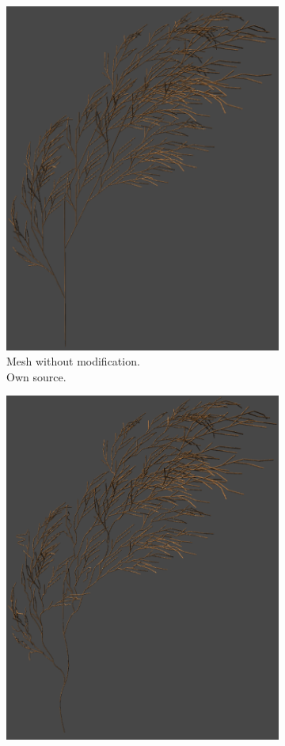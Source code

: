 \documentclass[b5paper,twoside,11pt]{article}
\begin{document}
\FloatBarrier
\begin{figure}[!htp]

\centering
\begin{subfigure}{.49\textwidth}
  \centering
  \includegraphics[width=0.8\linewidth]{siatka1}
\caption{Mesh without modification.\\Own source. \label{przyklad1.siatka}}
\end{subfigure}
\begin{subfigure}{.49\textwidth}
  \centering
  \includegraphics[width=0.8\linewidth]{siatkaMOD1}

\end{subfigure}
\end{figure}
\end{document}
